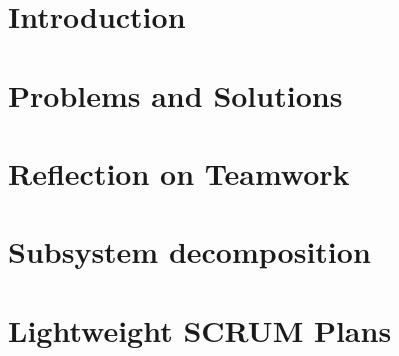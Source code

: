 \documentclass[english,a4paper,pdftex]{report}
\begin{document}

\newpage

\tableofcontents

\section{Introduction}
\label{sec:intro}

\section{Problems and Solutions}
\label{sec:problems}

\section{Reflection on Teamwork}
\label{sec:reflection}

\section{Subsystem decomposition}
\label{sec:subsystem}

\section{Lightweight SCRUM Plans}
\label{sec:scrum}

\newpage

%
\printglossaries
\appendix


\end{document}
